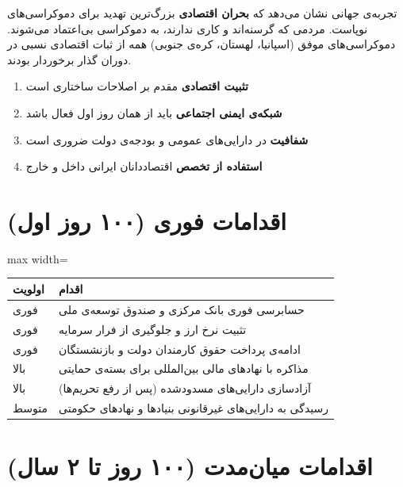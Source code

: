 \begin{notebox}
تجربه‌ی جهانی نشان می‌دهد که \textbf{بحران اقتصادی} بزرگ‌ترین تهدید برای دموکراسی‌های نوپاست. مردمی که گرسنه‌اند و کاری ندارند، به دموکراسی بی‌اعتماد می‌شوند. دموکراسی‌های موفق (اسپانیا، لهستان، کره‌ی جنوبی) همه از ثبات اقتصادی نسبی در دوران گذار برخوردار بودند.
\end{notebox}

\begin{enumerate}
  \item \textbf{تثبیت اقتصادی} مقدم بر اصلاحات ساختاری است
  \item \textbf{شبکه‌ی ایمنی اجتماعی} باید از همان روز اول فعال باشد
  \item \textbf{شفافیت} در دارایی‌های عمومی و بودجه‌ی دولت ضروری است
  \item \textbf{استفاده از تخصص} اقتصاددانان ایرانی داخل و خارج
\end{enumerate}

\section{اقدامات فوری (۱۰۰ روز اول)}

\begin{adjustbox}{max width=\linewidth}
\begin{tabular}{@{}lp{10.5cm}@{}}
\toprule
\textbf{اولویت} & \textbf{اقدام} \\
\midrule
\rowcolor{DangerBg}
فوری &
  حسابرسی فوری بانک مرکزی و صندوق توسعه‌ی ملی \\
\rowcolor{DangerBg}
فوری &
  تثبیت نرخ ارز و جلوگیری از فرار سرمایه \\
\rowcolor{DangerBg}
فوری &
  ادامه‌ی پرداخت حقوق کارمندان دولت و بازنشستگان \\
\rowcolor{WarningBg}
بالا &
  مذاکره با نهادهای مالی بین‌المللی برای بسته‌ی حمایتی \\
\rowcolor{WarningBg}
بالا &
  آزادسازی دارایی‌های مسدودشده (پس از رفع تحریم‌ها) \\
\rowcolor{NodeBg}
متوسط &
  رسیدگی به دارایی‌های غیرقانونی بنیادها و نهادهای حکومتی \\
\bottomrule
\end{tabular}
\end{adjustbox}

\section{اقدامات میان‌مدت (۱۰۰ روز تا ۲ سال)}

